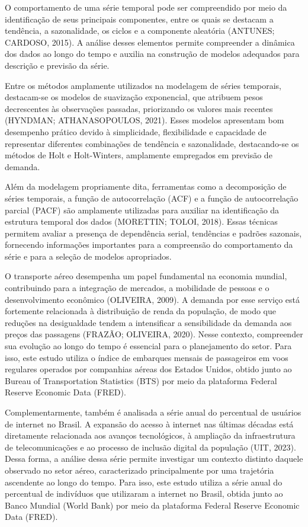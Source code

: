\documentclass[12pt, a4paper]{article}
\begin{document}
O comportamento de uma série temporal pode ser compreendido por meio da identificação de seus principais componentes, entre os quais se destacam a tendência, a sazonalidade, os ciclos e a componente aleatória (ANTUNES; CARDOSO, 2015)\cite{antunes2015}. A análise desses elementos permite compreender a dinâmica dos dados ao longo do tempo e auxilia na construção de modelos adequados para descrição e previsão da série.

Entre os métodos amplamente utilizados na modelagem de séries temporais, destacam-se os modelos de suavização exponencial, que atribuem pesos decrescentes às observações passadas, priorizando os valores mais recentes (HYNDMAN; ATHANASOPOULOS, 2021)\cite{hyndman2021fpp3}. Esses modelos apresentam bom desempenho prático devido à simplicidade, flexibilidade e capacidade de representar diferentes combinações de tendência e sazonalidade, destacando-se os métodos de Holt e Holt-Winters, amplamente empregados em previsão de demanda.

Além da modelagem propriamente dita, ferramentas como a decomposição de séries temporais, a função de autocorrelação (ACF) e a função de autocorrelação parcial (PACF) são amplamente utilizadas para auxiliar na identificação da estrutura temporal dos dados (MORETTIN; TOLOI, 2018)\cite{morettin2018}. Essas técnicas permitem avaliar a presença de dependência serial, tendências e padrões sazonais, fornecendo informações importantes para a compreensão do comportamento da série e para a seleção de modelos apropriados.

O transporte aéreo desempenha um papel fundamental na economia mundial, contribuindo para a integração de mercados, a mobilidade de pessoas e o desenvolvimento econômico (OLIVEIRA, 2009)\cite{oliveira2009}. A demanda por esse serviço está fortemente relacionada à distribuição de renda da população, de modo que reduções na desigualdade tendem a intensificar a sensibilidade da demanda aos preços das passagens (FRAZÃO; OLIVEIRA, 2020)\cite{frazao2020}. Nesse contexto, compreender sua evolução ao longo do tempo é essencial para o planejamento do setor. Para isso, este estudo utiliza o índice de embarques mensais de passageiros em voos regulares operados por companhias aéreas dos Estados Unidos, obtido junto ao Bureau of Transportation Statistics (BTS) por meio da plataforma Federal Reserve Economic Data (FRED)\cite{fred_enplane}.

Complementarmente, também é analisada a série anual do percentual de usuários de internet no Brasil. A expansão do acesso à internet nas últimas décadas está diretamente relacionada aos avanços tecnológicos, à ampliação da infraestrutura de telecomunicações e ao processo de inclusão digital da população (UIT, 2023)\cite{uit2023}. Dessa forma, a análise dessa série permite investigar um contexto distinto daquele observado no setor aéreo, caracterizado principalmente por uma trajetória ascendente ao longo do tempo. Para isso, este estudo utiliza a série anual do percentual de indivíduos que utilizaram a internet no Brasil, obtida junto ao Banco Mundial (World Bank) por meio da plataforma Federal Reserve Economic Data (FRED)\cite{fred_internet}.
\end{document}
